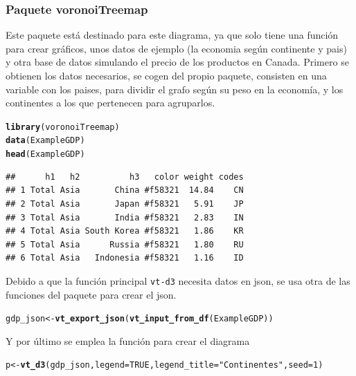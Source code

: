 \documentclass{article}\usepackage[]{graphicx}\usepackage[]{color}
\makeatletter
\newcommand{\hlnum}[1]{\textcolor[rgb]{0.686,0.059,0.569}{#1}}%
\newcommand{\hlstr}[1]{\textcolor[rgb]{0.192,0.494,0.8}{#1}}%
\newcommand{\hlstd}[1]{\textcolor[rgb]{0.345,0.345,0.345}{#1}}%
\newcommand{\hlkwb}[1]{\textcolor[rgb]{0.69,0.353,0.396}{#1}}%
\newcommand{\hlkwc}[1]{\textcolor[rgb]{0.333,0.667,0.333}{#1}}%
\newcommand{\hlkwd}[1]{\textcolor[rgb]{0.737,0.353,0.396}{\textbf{#1}}}%
\newenvironment{kframe}{%
 \def\at@end@of@kframe{}%
 \ifinner\ifhmode%
  \def\at@end@of@kframe{\end{minipage}}%
  \begin{minipage}{\columnwidth}%
 \fi\fi%
 \def\FrameCommand##1{\hskip\@totalleftmargin \hskip-\fboxsep
 \colorbox{shadecolor}{##1}\hskip-\fboxsep
     \hskip-\linewidth \hskip-\@totalleftmargin \hskip\columnwidth}%
 \MakeFramed {\advance\hsize-\width
   \@totalleftmargin\z@ \linewidth\hsize
   \@setminipage}}%
 {\par\unskip\endMakeFramed%
 \at@end@of@kframe}
\newenvironment{knitrout}{}{} %
\makeatother
\begin{document}
\subsubsection{Paquete voronoiTreemap}
Este paquete %
est\'a destinado para este diagrama, ya que solo tiene una funci\'on para crear  gr\'aficos, unos datos de ejemplo (la economia seg\'un continente y pais) y otra base de datos simulando el precio de los productos en Canada.
Primero se obtienen los datos necesarios, se cogen del propio paquete, consisten en una variable con los paises, para dividir el grafo seg\'un su peso en la econom\'ia, y los continentes a los que pertenecen para agruparlos.
\begin{knitrout}
\color{fgcolor}\begin{kframe}
\begin{alltt}
\hlkwd{library}\hlstd{(voronoiTreemap)}
\hlkwd{data}\hlstd{(ExampleGDP)}
\hlkwd{head}\hlstd{(ExampleGDP)}
\end{alltt}
\begin{verbatim}
##      h1   h2          h3   color weight codes
## 1 Total Asia       China #f58321  14.84    CN
## 2 Total Asia       Japan #f58321   5.91    JP
## 3 Total Asia       India #f58321   2.83    IN
## 4 Total Asia South Korea #f58321   1.86    KR
## 5 Total Asia      Russia #f58321   1.80    RU
## 6 Total Asia   Indonesia #f58321   1.16    ID
\end{verbatim}
\end{kframe}
\end{knitrout}
Debido a que la funci\'on principal \texttt{vt-d3} necesita datos en json, se usa otra de las funciones del paquete para crear el json.
\begin{knitrout}
\color{fgcolor}\begin{kframe}
\begin{alltt}
\hlstd{gdp_json} \hlkwb{<-} \hlkwd{vt_export_json}\hlstd{(}\hlkwd{vt_input_from_df}\hlstd{(ExampleGDP))}
\end{alltt}
\end{kframe}
\end{knitrout}
Y por \'ultimo se emplea la funci\'on para crear el diagrama
\begin{knitrout}
\color{fgcolor}\begin{kframe}
\begin{alltt}
\hlstd{p} \hlkwb{<-} \hlkwd{vt_d3}\hlstd{(gdp_json,} \hlkwc{legend} \hlstd{=} \hlnum{TRUE}\hlstd{,} \hlkwc{legend_title} \hlstd{=} \hlstr{"Continentes"}\hlstd{,} \hlkwc{seed} \hlstd{=} \hlnum{1}\hlstd{)}
\end{alltt}
\end{kframe}
\end{knitrout}
\end{document}
